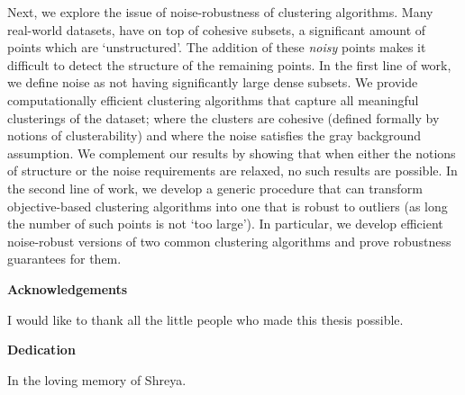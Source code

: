 \documentclass[letterpaper,12pt,titlepage,oneside,final]{book}
\let\origdoublepage\cleardoublepage
\newcommand{\clearemptydoublepage}{%
  \clearpage{\pagestyle{empty}\origdoublepage}}
\let\cleardoublepage\clearemptydoublepage
\begin{document}
Next, we explore the issue of noise-robustness of clustering algorithms. Many real-world datasets, have on top of cohesive subsets, a significant amount of points which are `unstructured'. The addition of these \textit{noisy} points makes it difficult to detect the structure of the remaining points. In the first line of work, we define noise as not having significantly large dense subsets. We provide computationally efficient clustering algorithms that capture all meaningful clusterings of the dataset; where the clusters are cohesive (defined formally by notions of clusterability) and where the noise satisfies the gray background assumption. We complement our results by showing that when either the notions of structure or the noise requirements are relaxed, no such results are possible. In the second line of work, we develop a generic procedure that can transform objective-based clustering algorithms into one that is robust to outliers (as long the number of such points is not `too large'). In particular, we develop efficient noise-robust versions of two common clustering algorithms and prove robustness guarantees for them. 

   

\cleardoublepage

\begin{center}\textbf{Acknowledgements}\end{center}

I would like to thank all the little people who made this thesis possible.
\cleardoublepage

\begin{center}\textbf{Dedication}\end{center}

\begin{center}{In the loving memory of Shreya.}\end{center}
\cleardoublepage

\renewcommand\contentsname{Table of Contents}
\tableofcontents
\cleardoublepage
{}    %

\listoftables
\cleardoublepage
{}		%

\listoffigures
\cleardoublepage
{}		%

{}		%


\ifdefined\COMPLETE
\else
\end{document}
